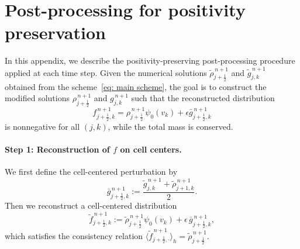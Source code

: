 \documentclass[11pt,twoside]{article}
\theoremstyle{nonumberplain}
\begin{document}
\section{Post-processing for positivity preservation}\label{sec:limiter}
In this appendix, we describe the positivity-preserving post-processing procedure applied at each time step.  
Given the numerical solutions $\tilde{\rho}_{j+\frac12}^{\,n+1}$ and $\tilde{g}_{j,k}^{\,n+1}$ obtained from the scheme~\eqref{eq: main scheme}, the goal is to construct the modified solutions $\rho_{j+\frac12}^{\,n+1}$ and $g_{j,k}^{\,n+1}$ such that the reconstructed distribution
\[
    f_{j+\frac12,k}^{\,n+1} 
    = \rho_{j+\frac12}^{\,n+1}\psi_0(v_k)
    + \epsilon \bar{g}_{j+\frac12,k}^{\,n+1}
\]
is nonnegative for all $(j,k)$, while the total mass is conserved.






\paragraph{Step 1: Reconstruction of $f$ on cell centers.}
We first define the cell-centered perturbation by
\[
    \bar{g}_{j+\frac12,k}^{\,n+1}
    := \frac{\tilde{g}_{j,k}^{\,n+1}
    + \tilde{\rho}_{j+1,k}^{\,n+1}}{2}.
\]
Then we reconstruct a cell-centered distribution
\[
    \tilde{f}_{j+\frac12,k}^{\,n+1}
    := \tilde{\rho}_{j+\frac12}^{\,n+1}\psi_0(v_k)
     + \epsilon\,\bar{g}_{j+\frac12,k}^{\,n+1},
\]
which satisfies the consistency relation  
$\langle \tilde{f}_{j+\frac12,\cdot}^{\,n+1}\rangle_h = \tilde{\rho}_{j+\frac12}^{\,n+1}$.
\end{document}
